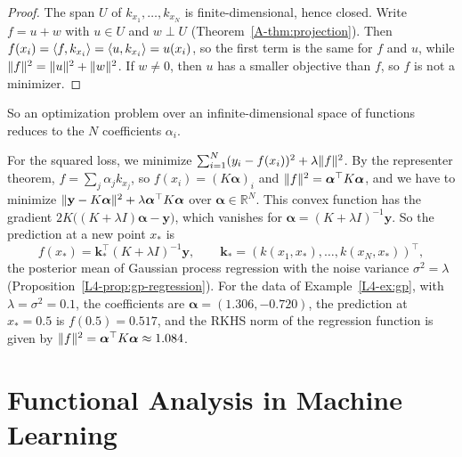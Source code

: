 \begin{proof}
    The span $U$ of $k_{x_1}, \ldots, k_{x_N}$ is finite-dimensional, hence closed. Write $f = u + w$ with $u \in U$ and $w \perp U$ (Theorem~\ref{A-thm:projection}). Then $f(x_i) = \langle f, k_{x_i} \rangle = \langle u, k_{x_i} \rangle = u(x_i)$, so the first term is the same for $f$ and $u$, while $\lVert f \rVert^2 = \lVert u \rVert^2 + \lVert w \rVert^2$. If $w \neq 0$, then $u$ has a smaller objective than $f$, so $f$ is not a minimizer.
\end{proof}

So an optimization problem over an infinite-dimensional space of functions reduces to the $N$ coefficients $\alpha_i$.

\begin{example}\label{A-ex:kernel-ridge}
    For the squared loss, we minimize $\sum_{i=1}^N (y_i - f(x_i))^2 + \lambda\lVert f \rVert^2$. By the representer theorem, $f = \sum_j \alpha_jk_{x_j}$, so $f(x_i) = (K\boldsymbol{\alpha})_i$ and $\lVert f \rVert^2 = \boldsymbol{\alpha}^\top K\boldsymbol{\alpha}$, and we have to minimize $\lVert \mathbf{y} - K\boldsymbol{\alpha} \rVert^2 + \lambda\boldsymbol{\alpha}^\top K\boldsymbol{\alpha}$ over $\boldsymbol{\alpha} \in \mathbb{R}^N$. This convex function has the gradient $2K\big((K + \lambda I)\boldsymbol{\alpha} - \mathbf{y}\big)$, which vanishes for $\boldsymbol{\alpha} = (K + \lambda I)^{-1}\mathbf{y}$. So the prediction at a new point $x_*$ is
    \[f(x_*) = \mathbf{k}_*^\top(K + \lambda I)^{-1}\mathbf{y}, \qquad \mathbf{k}_* = (k(x_1, x_*), \ldots, k(x_N, x_*))^\top,\]
    the posterior mean of Gaussian process regression with the noise variance $\sigma^2 = \lambda$ (Proposition~\ref{L4-prop:gp-regression}). For the data of Example~\ref{L4-ex:gp}, with $\lambda = \sigma^2 = 0.1$, the coefficients are $\boldsymbol{\alpha} = (1.306, -0.720)$, the prediction at $x_* = 0.5$ is $f(0.5) = 0.517$, and the RKHS norm of the regression function is given by $\lVert f \rVert^2 = \boldsymbol{\alpha}^\top K\boldsymbol{\alpha} \approx 1.084$.
\end{example}

\section{Functional Analysis in Machine Learning}\label{A-sec:fa-ml}

